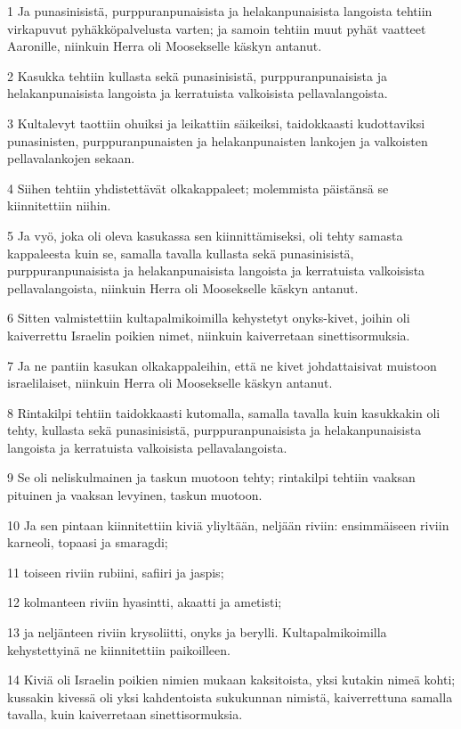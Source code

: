 \par 1 Ja punasinisistä, purppuranpunaisista ja helakanpunaisista langoista tehtiin virkapuvut pyhäkköpalvelusta varten; ja samoin tehtiin muut pyhät vaatteet Aaronille, niinkuin Herra oli Moosekselle käskyn antanut.
\par 2 Kasukka tehtiin kullasta sekä punasinisistä, purppuranpunaisista ja helakanpunaisista langoista ja kerratuista valkoisista pellavalangoista.
\par 3 Kultalevyt taottiin ohuiksi ja leikattiin säikeiksi, taidokkaasti kudottaviksi punasinisten, purppuranpunaisten ja helakanpunaisten lankojen ja valkoisten pellavalankojen sekaan.
\par 4 Siihen tehtiin yhdistettävät olkakappaleet; molemmista päistänsä se kiinnitettiin niihin.
\par 5 Ja vyö, joka oli oleva kasukassa sen kiinnittämiseksi, oli tehty samasta kappaleesta kuin se, samalla tavalla kullasta sekä punasinisistä, purppuranpunaisista ja helakanpunaisista langoista ja kerratuista valkoisista pellavalangoista, niinkuin Herra oli Moosekselle käskyn antanut.
\par 6 Sitten valmistettiin kultapalmikoimilla kehystetyt onyks-kivet, joihin oli kaiverrettu Israelin poikien nimet, niinkuin kaiverretaan sinettisormuksia.
\par 7 Ja ne pantiin kasukan olkakappaleihin, että ne kivet johdattaisivat muistoon israelilaiset, niinkuin Herra oli Moosekselle käskyn antanut.
\par 8 Rintakilpi tehtiin taidokkaasti kutomalla, samalla tavalla kuin kasukkakin oli tehty, kullasta sekä punasinisistä, purppuranpunaisista ja helakanpunaisista langoista ja kerratuista valkoisista pellavalangoista.
\par 9 Se oli neliskulmainen ja taskun muotoon tehty; rintakilpi tehtiin vaaksan pituinen ja vaaksan levyinen, taskun muotoon.
\par 10 Ja sen pintaan kiinnitettiin kiviä yliyltään, neljään riviin: ensimmäiseen riviin karneoli, topaasi ja smaragdi;
\par 11 toiseen riviin rubiini, safiiri ja jaspis;
\par 12 kolmanteen riviin hyasintti, akaatti ja ametisti;
\par 13 ja neljänteen riviin krysoliitti, onyks ja berylli. Kultapalmikoimilla kehystettyinä ne kiinnitettiin paikoilleen.
\par 14 Kiviä oli Israelin poikien nimien mukaan kaksitoista, yksi kutakin nimeä kohti; kussakin kivessä oli yksi kahdentoista sukukunnan nimistä, kaiverrettuna samalla tavalla, kuin kaiverretaan sinettisormuksia.
